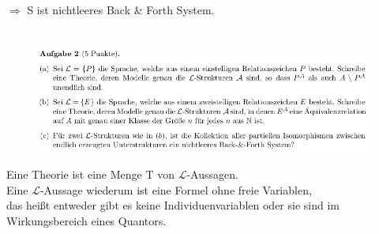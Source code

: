 \documentclass[a4paper]{scrartcl}
\begin{document}
    $\Rightarrow$ S ist nichtleeres Back \& Forth System.
    



\section*{}%
\label{sec:aufgabe_2}

    \begin{figure}[H]
        \centering
        \includegraphics[scale=0.6]{./A-2.png}
        \label{fig:}
    \end{figure}

    Eine Theorie ist eine Menge T von $\mathscr{L}$-Aussagen.\\
    Eine $\mathscr{L}$-Aussage wiederum ist eine Formel ohne freie Variablen,\\
    das heißt entweder gibt es keine Individuenvariablen oder sie sind im Wirkungsbereich
    eines Quantors.\\
\end{document}
